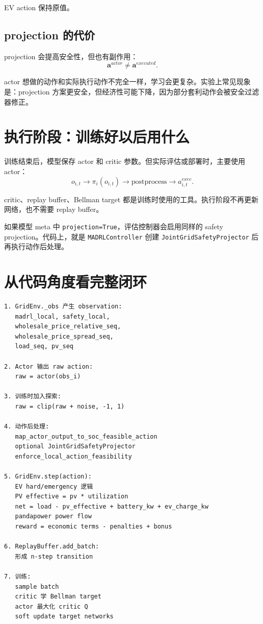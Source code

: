 \documentclass[UTF8,zihao=-4]{ctexart}
\begin{document}
EV action 保持原值。

\subsection{projection 的代价}

projection 会提高安全性，但也有副作用：
\begin{equation}
\bm a^{actor}\ne \bm a^{executed}.
\end{equation}

actor 想做的动作和实际执行动作不完全一样，学习会更复杂。实验上常见现象是：projection 方案更安全，但经济性可能下降，因为部分套利动作会被安全过滤器修正。

\section{执行阶段：训练好以后用什么}

训练结束后，模型保存 actor 和 critic 参数。但实际评估或部署时，主要使用 actor：
\begin{equation}
o_{i,t}
\rightarrow
\pi_i(o_{i,t})
\rightarrow
\text{postprocess}
\rightarrow
a^{exec}_{i,t}.
\end{equation}

critic、replay buffer、Bellman target 都是训练时使用的工具。执行阶段不再更新网络，也不需要 replay buffer。

如果模型 meta 中 \texttt{projection=True}，评估控制器会启用同样的 safety projection。代码上，就是 \texttt{MADRLController} 创建 \texttt{JointGridSafetyProjector} 后再执行动作后处理。

\section{从代码角度看完整闭环}

\begin{lstlisting}[language={},caption={项目中的 MADRL 闭环}]
1. GridEnv._obs 产生 observation:
   madrl_local, safety_local,
   wholesale_price_relative_seq,
   wholesale_price_spread_seq,
   load_seq, pv_seq

2. Actor 输出 raw action:
   raw = actor(obs_i)

3. 训练时加入探索:
   raw = clip(raw + noise, -1, 1)

4. 动作后处理:
   map_actor_output_to_soc_feasible_action
   optional JointGridSafetyProjector
   enforce_local_action_feasibility

5. GridEnv.step(action):
   EV hard/emergency 逻辑
   PV effective = pv * utilization
   net = load - pv_effective + battery_kw + ev_charge_kw
   pandapower power flow
   reward = economic terms - penalties + bonus

6. ReplayBuffer.add_batch:
   形成 n-step transition

7. 训练:
   sample batch
   critic 学 Bellman target
   actor 最大化 critic Q
   soft update target networks
\end{lstlisting}
\end{document}
